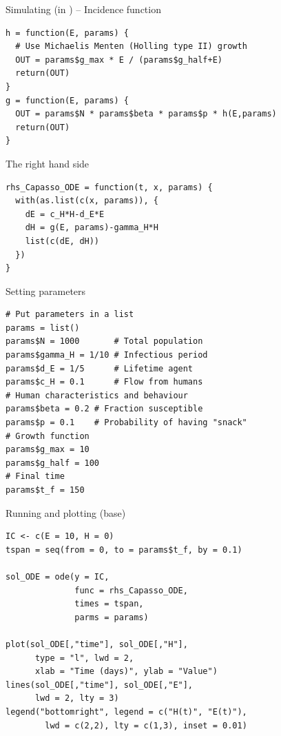 \documentclass[aspectratio=169]{beamer}
\begin{document}
\begin{frame}[fragile]{Simulating (in ) -- Incidence function}
\begin{lstlisting}
h = function(E, params) {
  # Use Michaelis Menten (Holling type II) growth
  OUT = params$g_max * E / (params$g_half+E)
  return(OUT)
}
g = function(E, params) {
  OUT = params$N * params$beta * params$p * h(E,params)
  return(OUT)
}
\end{lstlisting}
\end{frame}

\begin{frame}[fragile]{The right hand side}
\begin{lstlisting}
rhs_Capasso_ODE = function(t, x, params) {
  with(as.list(c(x, params)), {
    dE = c_H*H-d_E*E
    dH = g(E, params)-gamma_H*H
    list(c(dE, dH))
  })
}  
\end{lstlisting}
\end{frame}

\begin{frame}[fragile]{Setting parameters}
\begin{lstlisting}
# Put parameters in a list
params = list()
params$N = 1000       # Total population
params$gamma_H = 1/10 # Infectious period
params$d_E = 1/5      # Lifetime agent
params$c_H = 0.1      # Flow from humans
# Human characteristics and behaviour
params$beta = 0.2 # Fraction susceptible
params$p = 0.1    # Probability of having "snack"
# Growth function
params$g_max = 10
params$g_half = 100
# Final time
params$t_f = 150  
\end{lstlisting}
\end{frame}

\begin{frame}[fragile]{Running and plotting (base)}
\begin{lstlisting}
IC <- c(E = 10, H = 0)
tspan = seq(from = 0, to = params$t_f, by = 0.1)

sol_ODE = ode(y = IC,
              func = rhs_Capasso_ODE,
              times = tspan,
              parms = params)

plot(sol_ODE[,"time"], sol_ODE[,"H"],
      type = "l", lwd = 2,
      xlab = "Time (days)", ylab = "Value")
lines(sol_ODE[,"time"], sol_ODE[,"E"], 
      lwd = 2, lty = 3)
legend("bottomright", legend = c("H(t)", "E(t)"),
        lwd = c(2,2), lty = c(1,3), inset = 0.01)
\end{lstlisting}
\end{frame}
\end{document}
